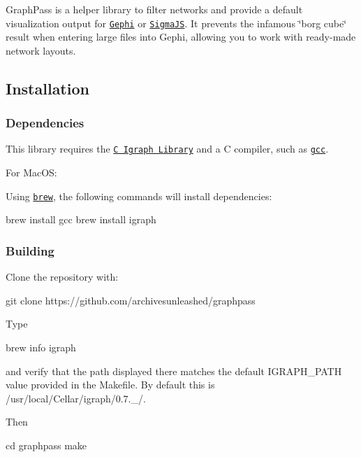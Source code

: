 

Graph\+Pass is a helper library to filter networks and provide a default visualization output for \href{https://gephi.org/}{\tt Gephi} or \href{https://sigmaja.org}{\tt Sigma\+JS}. It prevents the infamous \char`\"{}borg cube\char`\"{} result when entering large files into Gephi, allowing you to work with ready-\/made network layouts.

\subsection*{Installation}

\subsubsection*{Dependencies}

This library requires the \href{http://igraph.org/c/}{\tt C Igraph Library} and a C compiler, such as \href{https://gcc.gnu.org/}{\tt gcc}.

For Mac\+OS\+:

Using \href{https://brew.sh/}{\tt brew}, the following commands will install dependencies\+:


\begin{DoxyCode}
brew install gcc
brew install igraph
\end{DoxyCode}


\subsubsection*{Building}

Clone the repository with\+:


\begin{DoxyCode}
git clone https://github.com/archivesunleashed/graphpass
\end{DoxyCode}


Type


\begin{DoxyCode}
brew info igraph
\end{DoxyCode}


and verify that the path displayed there matches the default I\+G\+R\+A\+P\+H\+\_\+\+P\+A\+TH value provided in the Makefile. By default this is {\ttfamily /usr/local/\+Cellar/igraph/0.7.\+\_/}.

Then


\begin{DoxyCode}
cd graphpass
make
\end{DoxyCode}



